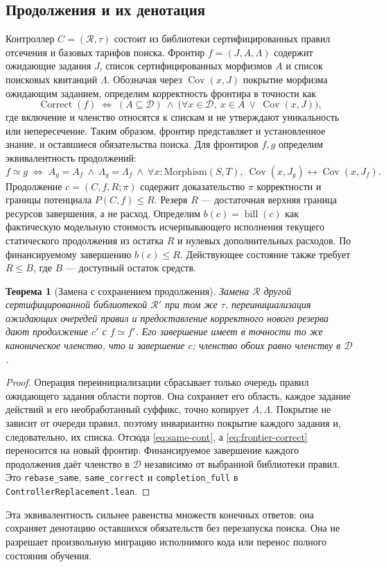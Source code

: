 \documentclass[10pt,a4paper]{article}
\newtheorem{theorem}{Теорема}[section]
\newcommand{\CanonRef}{\mathcal D}
\newcommand{\bill}{\operatorname{bill}}
\newcommand{\Cov}{\operatorname{Cov}}
\newcommand{\Correct}{\operatorname{Correct}}
\newcommand{\rc}[1]{\allowbreak\texttt{#1}\allowbreak}
\begin{document}
\subsection{Продолжения и их денотация}
Контроллер $C=(\mathcal R,\tau)$ состоит из библиотеки сертифицированных правил отсечения и базовых тарифов поиска. Фронтир $f=(J,A,\Lambda)$ содержит ожидающие задания $J$, список сертифицированных морфизмов $A$ и список поисковых квитанций $\Lambda$. Обозначая через $\Cov(x,J)$ покрытие морфизма ожидающим заданием, определим корректность фронтира в точности как
\begin{equation}\label{eq:frontier-correct}
 \Correct(f)\;\Longleftrightarrow\;
 (A\subseteq\CanonRef)\ \land\
 \bigl(\forall x\in\CanonRef,\ x\in A\ \lor\ \Cov(x,J)\bigr),
\end{equation}
где включение и членство относятся к спискам и не утверждают уникальность или непересечение. Таким образом, фронтир представляет и установленное знание, и оставшиеся обязательства поиска. Для фронтиров $f,g$ определим эквивалентность продолжений:
\begin{equation}\label{eq:same-cont}
 f\simeq g\;\Longleftrightarrow\;
 A_g=A_f\ \land\ \Lambda_g=\Lambda_f\ \land\
 \forall x:\mathrm{Morphism}(S,T),\ \Cov(x,J_g)\leftrightarrow\Cov(x,J_f).
\end{equation}
Продолжение $c=(C,f,R;\pi)$ содержит доказательство $\pi$ корректности и границы потенциала $P(C,f)\le R$. Резерв $R$ --- достаточная верхняя граница ресурсов завершения, а не расход. Определим $b(c)=\bill(c)$ как фактическую модельную стоимость исчерпывающего исполнения текущего статического продолжения из остатка $R$ и нулевых дополнительных расходов. По финансируемому завершению $b(c)\le R$. Действующее состояние также требует $R\le B$, где $B$ --- доступный остаток средств.

\begin{theorem}[Замена с сохранением продолжения]\label{thm:rebase}
Замена $\mathcal R$ другой сертифицированной библиотекой $\mathcal R'$ при том же $\tau$, переинициализация ожидающих очередей правил и предоставление корректного нового резерва дают продолжение $c'$ с $f\simeq f'$. Его завершение имеет в точности то же каноническое членство, что и завершение $c$; членство обоих равно членству в $\CanonRef$.
\end{theorem}
\begin{proof}
Операция переинициализации сбрасывает только очередь правил ожидающего задания области портов. Она сохраняет его область, каждое задание действий и его необработанный суффикс, точно копирует $A,\Lambda$. Покрытие не зависит от очереди правил, поэтому инвариантно покрытие каждого задания и, следовательно, их списка. Отсюда \eqref{eq:same-cont}, а \eqref{eq:frontier-correct} переносится на новый фронтир. Финансируемое завершение каждого продолжения даёт членство в $\CanonRef$ независимо от выбранной библиотеки правил. Это \rc{rebase\_same}, \rc{same\_correct} и \rc{completion\_full} в \rc{ControllerReplacement.lean}.
\end{proof}
Эта эквивалентность сильнее равенства множеств конечных ответов: она сохраняет денотацию оставшихся обязательств без перезапуска поиска. Она не разрешает произвольную миграцию исполнимого кода или перенос полного состояния обучения.
\end{document}
